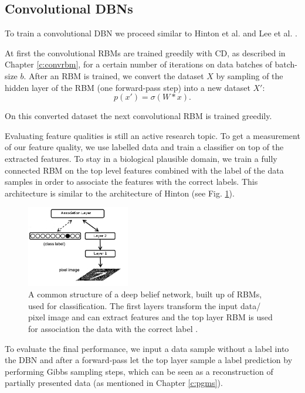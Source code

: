 \subsection{Convolutional DBNs} \label{c:convdbns}

To train a convolutional DBN we proceed similar to Hinton et al. and Lee et al. \cite{hinton2006fast}\cite{lee2009convolutional}.

At first the convolutional RBMs are trained greedily with CD, as described in Chapter \ref{c:convrbm}, for a certain number of iterations on data batches of batch-size $b$.
After an RBM is trained, we convert the dataset $X$ by sampling of the hidden layer of the RBM (one forward-pass step) into a new dataset $X'$:
\[
p(x') = \sigma(W * x) .
\]

On this converted dataset the next convolutional RBM is trained greedily.

Evaluating feature qualities is still an active research topic.
To get a measurement of our feature quality, we use labelled data and train a classifier on top of the extracted features.
To stay in a biological plausible domain, we train a fully connected RBM on the top level features combined with the label of the data samples in order to associate the features with the correct labels.
This architecture is similar to the architecture of Hinton \cite{hinton2006fast} (see Fig. \ref{fig:dbnmnist}).

\begin{figure}
	\centering
    	\includegraphics[width=0.4\textwidth]{imgs/dbn_mnist.png} 
    \caption[A common structure of a deep belief network.]{A common structure of a deep belief network, built up of RBMs, used for classification. The first layers transform the input data/ pixel image and can extract features and the top layer RBM is used for association the data with the correct label \cite{Zorzi2013Modeling}.}
	\label{fig:dbnmnist}
\end{figure}

To evaluate the final performance, we input a data sample without a label into the DBN and after a forward-pass let the top layer sample a label prediction by performing Gibbs sampling steps, which can be seen as a reconstruction of partially presented data (as mentioned in Chapter \ref{c:pgms}).


